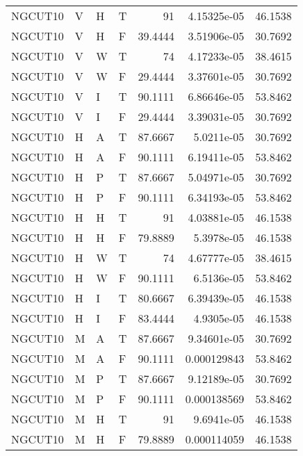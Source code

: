 \begin{longtable}{llllrrr}
    NGCUT10  & V     & H     & T          & 91         & 4.15325e-05 & 46.1538  \\
    NGCUT10  & V     & H     & F          & 39.4444    & 3.51906e-05 & 30.7692  \\
    NGCUT10  & V     & W     & T          & 74         & 4.17233e-05 & 38.4615  \\
    NGCUT10  & V     & W     & F          & 29.4444    & 3.37601e-05 & 30.7692  \\
    NGCUT10  & V     & I     & T          & 90.1111    & 6.86646e-05 & 53.8462  \\
    NGCUT10  & V     & I     & F          & 29.4444    & 3.39031e-05 & 30.7692  \\
    NGCUT10  & H     & A     & T          & 87.6667    & 5.0211e-05  & 30.7692  \\
    NGCUT10  & H     & A     & F          & 90.1111    & 6.19411e-05 & 53.8462  \\
    NGCUT10  & H     & P     & T          & 87.6667    & 5.04971e-05 & 30.7692  \\
    NGCUT10  & H     & P     & F          & 90.1111    & 6.34193e-05 & 53.8462  \\
    NGCUT10  & H     & H     & T          & 91         & 4.03881e-05 & 46.1538  \\
    NGCUT10  & H     & H     & F          & 79.8889    & 5.3978e-05  & 46.1538  \\
    NGCUT10  & H     & W     & T          & 74         & 4.67777e-05 & 38.4615  \\
    NGCUT10  & H     & W     & F          & 90.1111    & 6.5136e-05  & 53.8462  \\
    NGCUT10  & H     & I     & T          & 80.6667    & 6.39439e-05 & 46.1538  \\
    NGCUT10  & H     & I     & F          & 83.4444    & 4.9305e-05  & 46.1538  \\
    NGCUT10  & M     & A     & T          & 87.6667    & 9.34601e-05 & 30.7692  \\
    NGCUT10  & M     & A     & F          & 90.1111    & 0.000129843 & 53.8462  \\
    NGCUT10  & M     & P     & T          & 87.6667    & 9.12189e-05 & 30.7692  \\
    NGCUT10  & M     & P     & F          & 90.1111    & 0.000138569 & 53.8462  \\
    NGCUT10  & M     & H     & T          & 91         & 9.6941e-05  & 46.1538  \\
    NGCUT10  & M     & H     & F          & 79.8889    & 0.000114059 & 46.1538  \\

\end{longtable}
